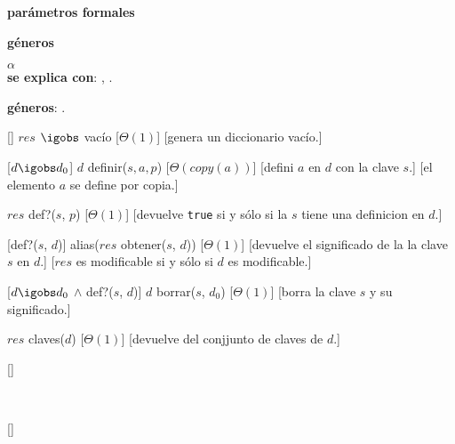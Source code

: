 
\begin{Interfaz}

  \textbf{parámetros formales}\parindent\\
  \parbox{1.7cm}{\textbf{géneros}} $\alpha$\\
 
 
  \textbf{se explica con}: , .

  \textbf{géneros}: .

  []%
  {$res$ $\igobs$ vac\'io}%
  [$\Theta(1)$]
  [genera un diccionario vac\'io.]

  [$d \igobs d_0$]
  {$d$ \igobs definir($s, a, p$)}
  [$\Theta(copy(a))$]
  [defini $a$ en $d$ con la clave $s$.]
  [el elemento $a$ se define por copia.]

  {$res$ \igobs def?($s$, $p$)}
  [$\Theta(1)$]
  [devuelve \texttt{true} si y sólo si la $s$ tiene una definicion en $d$.]

  [def?($s$, $d$)]
  {alias($res$ \igobs obtener($s$, $d$))}
  [$\Theta(1)$]
  [devuelve el significado de la la clave $s$ en $d$.]
  [$res$ es modificable si y sólo si $d$ es modificable.]

  [$d \igobs d_0$ $\land$ def?($s$, $d$)]
  {$d$ \igobs borrar($s$, $d_0$)}
  [$\Theta(1)$]
  [borra la clave $s$ y su significado.]

  {$res$ \igobs claves($d$)}
  [$\Theta(1)$]
  [devuelve del conjjunto de claves de $d$.]


\end{Interfaz}

\begin{Representacion}
  

  \begin{Estructura}{}[]
  \end{Estructura}


  ~

  \AbsFc[]{}[]{}

\end{Representacion}

\begin{Algoritmos}
  
\end{Algoritmos}

